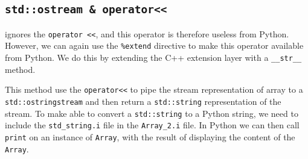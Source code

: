 \subsection{ \texttt{std::ostream \& operator<<}}%
\swig ignores the \texttt{operator <<}, %
and this operator is therefore useless from Python. However, we can again use the \texttt{\%extend} directive to make this operator available from Python. We do this by extending the C++ extension layer with a \texttt{\_\_str\_\_} method. 
\begin{code}
This method use the \texttt{operator<<} %
to pipe the stream representation of array to a \texttt{std::ostringstream} and then return a \texttt{std::string} representation of the stream. To make \swig able to convert a \texttt{std::string} to a Python string, we need to include the \texttt{std\_string.i} file in the \texttt{Array\_2.i} file. In Python we can then call \texttt{print} on an instance of \texttt{Array}, with the result of displaying the content of the \texttt{Array}.\par


\end{code}
